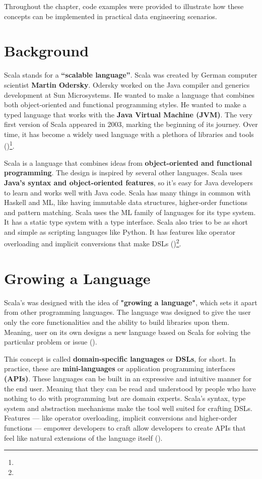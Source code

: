 Throughout the chapter, code examples were provided to illustrate how these concepts can be implemented in practical data engineering scenarios.

\section{Background}

Scala stands for a \textbf{“scalable language”}. Scala was created by German computer scientist \textbf{Martin Odersky}. Odersky worked on the Java compiler and generics development at Sun Microsystems. He wanted to make a language that combines both object-oriented and functional programming styles. He wanted to make a typed language that works with the \textbf{Java Virtual Machine (JVM)}. The very first version of Scala appeared in 2003, marking the beginning of its journey. Over time, it has become a widely used language with a plethora of libraries and tools (\cite{oderskyOverviewScalaProgramming2006})\footnote[1]{}.

Scala is a language that combines ideas from \textbf{object-oriented and functional programming}. The design is inspired by several other languages. Scala uses \textbf{Java's syntax and object-oriented features}, so it's easy for Java developers to learn and works well with Java code. Scala has many things in common with Haskell and ML, like having immutable data structures, higher-order functions and pattern matching. Scala uses the ML family of languages for its type system. It has a static type system with a type interface. Scala also tries to be as short and simple as scripting languages like Python. It has features like operator overloading and implicit conversions that make DSLs (\cite{odersky.etal_2021})\footnote[2]{}.

\section{Growing a Language}

Scala's was designed with the idea of \textbf{"growing a language"}, which sets it apart from other programming languages. The language was designed to give the user only the core functionalities and the ability to build libraries upon them. Meaning, user on its own designs a new language based on Scala for solving the particular problem or issue (\cite{odersky.etal_2021})\footnotemark[2].

This concept is called \textbf{domain-specific languages} or \textbf{DSLs}, for short. In practice, these are \textbf{mini-languages} or application programming interfaces \textbf{(APIs)}. These languages can be built in an expressive and intuitive manner for the end user. Meaning that they can be read and understood by people who have nothing to do with programming but are domain experts. Scala's syntax, type system and abstraction mechanisms make the tool well suited for crafting DSLs. Features — like operator overloading, implicit conversions and higher-order functions — empower developers to craft allow developers to create APIs that feel like natural extensions of the language itself (\cite{odersky.etal_2021})\footnotemark[2].

